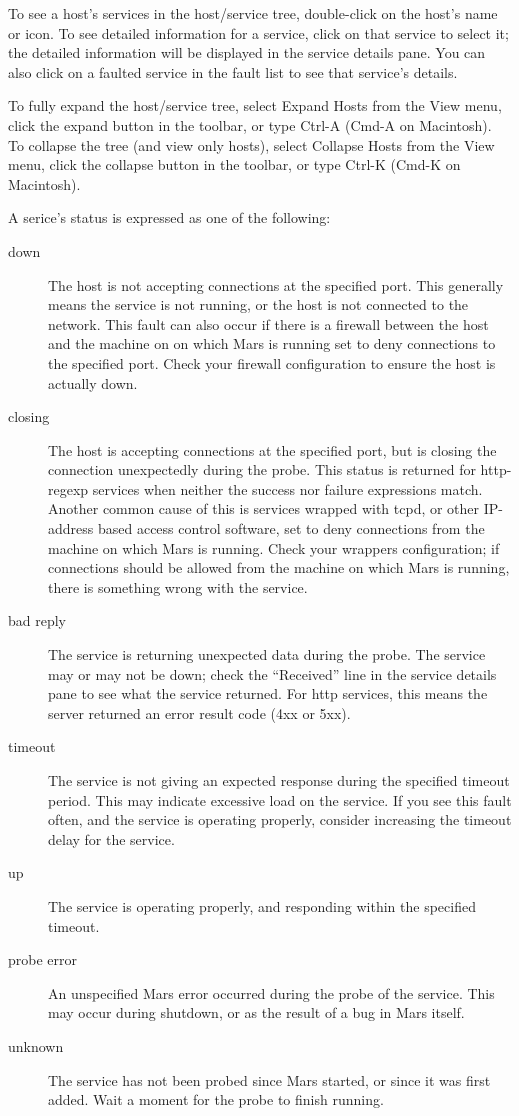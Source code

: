 \documentclass{article}
\newcommand{\guiitem}[1]{{\sf #1}}
\newcommand{\keystroke}[1]{{\sf #1}}
\begin{document}
To see a host's services in the host/service tree, double-click on the
host's name or icon. To see detailed information for a service, click
on that service to select it; the detailed information will be
displayed in the service details pane. You can also click on a faulted
service in the fault list to see that service's details.

To fully expand the host/service tree, select \guiitem{Expand Hosts}
from the \guiitem{View} menu, click the expand button in the toolbar,
or type \keystroke{Ctrl-A} (\keystroke{Cmd-A} on Macintosh). To
collapse the tree (and view only hosts), select \guiitem{Collapse
  Hosts} from the \guiitem{View} menu, click the collapse button in
the toolbar, or type \keystroke{Ctrl-K} (\keystroke{Cmd-K} on
Macintosh).

A serice's status is expressed as one of the following:

\begin{description}
\item[down] The host is not accepting connections at the specified
  port. This generally means the service is not running, or the host
  is not connected to the network. This fault can also occur if there
  is a firewall between the host and the machine on on which Mars is
  running set to deny connections to the specified port. Check your
  firewall configuration to ensure the host is actually down.
\item[closing] The host is accepting connections at the specified
  port, but is closing the connection unexpectedly during the
  probe. This status is returned for \guiitem{http-regexp} services
  when neither the success nor failure expressions match. Another
  common cause of this is services wrapped with tcpd, or other
  IP-address based access control software, set to deny connections
  from the machine on which Mars is running.  Check your wrappers
  configuration; if connections should be allowed from the machine on
  which Mars is running, there is something wrong with the service.
\item[bad reply] The service is returning unexpected data during the
  probe.  The service may or may not be down; check the ``Received''
  line in the service details pane to see what the service
  returned. For \guiitem{http} services, this means the server
  returned an error result code (4xx or 5xx).
\item[timeout] The service is not giving an expected response during
  the specified timeout period. This may indicate excessive load on
  the service. If you see this fault often, and the service is
  operating properly, consider increasing the timeout delay for the
  service.
\item[up] The service is operating properly, and responding within the
  specified timeout.
\item[probe error] An unspecified Mars error occurred during the probe
  of the service. This may occur during shutdown, or as the result of
  a bug in Mars itself.
\item[unknown] The service has not been probed since Mars started, or
  since it was first added. Wait a moment for the probe to finish
  running.
\end{description}
\end{document}
